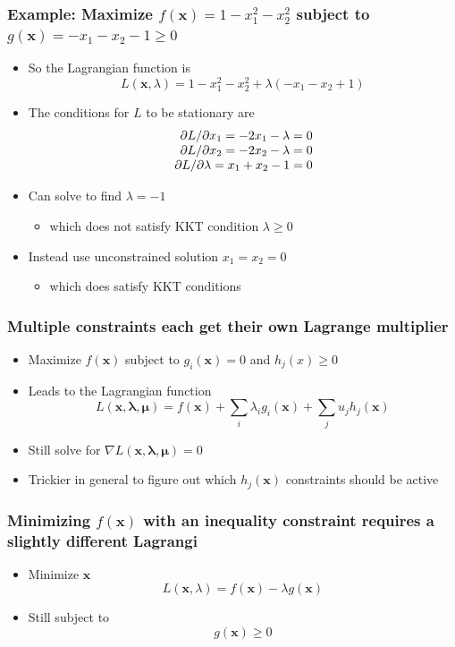 \documentclass[12pt,notes,mathserif]{beamer}
\begin{document}
\begin{frame}[c]
\frametitle{Example: Maximize $f(\mathbf{x})=1-x_1^2-x_2^2$ subject to $g(\mathbf{x})=-x_1-x_2-1\geqslant{}0$}
\begin{itemize}
\item So the Lagrangian function is 
\[
L(\mathbf{x},\lambda)=1-x_1^2-x_2^2+\lambda(-x_1-x_2+1)
\]
\item The conditions for $L$ to be stationary are 
\[
\begin{array}{r@{~}l}
\partial L/\partial x_1=-2x_1-\lambda=0\\
\partial L/\partial x_2=-2x_2-\lambda=0\\
\partial L/\partial \lambda=x_1+x_2-1=0\\
\end{array}
\]
\item Can solve to find $\lambda=-1$
\begin{itemize}
\item which does not satisfy KKT condition $\lambda \geqslant{}0$
\end{itemize}
\item Instead use unconstrained solution $x_1=x_2=0$
\begin{itemize}
\item which does satisfy KKT conditions
\end{itemize}
\end{itemize}
\end{frame}


\begin{frame}[c]
\frametitle{Multiple constraints each get their own Lagrange multiplier}
\begin{itemize}
\item Maximize $f(\mathbf{x})$ subject to $g_i(\mathbf{x})= 0$ and $h_j(x)\geqslant{}0$
\item Leads to the Lagrangian function
\[
L(\mathbf{x,\lambda,\mu})=f(\mathbf{x})+\sum_i \lambda_ig_i(\mathbf{x})+\sum_ju_jh_j(\mathbf{x})
\]
\item Still solve for $\nabla L(\mathbf{x,\lambda,\mu})= 0$
\item Trickier in general to figure out which $h_j(\mathbf{x})$ constraints should be active
\end{itemize}
\end{frame}



\begin{frame}[c]
\frametitle{Minimizing $f(\mathbf{x})$ with an inequality constraint requires a slightly different Lagrangi}
\begin{itemize}
\item Minimize \wrt $\mathbf{x}$
\[
L(\mathbf{x},\lambda)=f(\mathbf{x})-\lambda g(\mathbf{x})
\]
\item Still subject to
\[
g(\mathbf{x})\geqslant{}0
\]
\end{itemize}
\end{frame}
\end{document}
